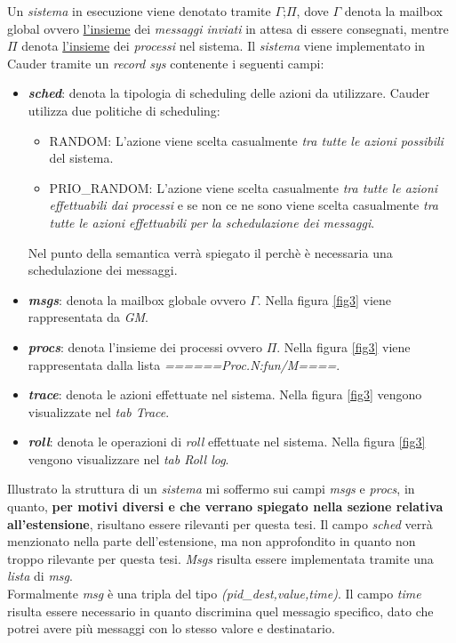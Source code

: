 \documentclass[background.tex]{subfiles}
\begin{document}
Un \textit{sistema} in esecuzione viene denotato tramite $\Gamma$;$\Pi$, dove $\Gamma$ denota la mailbox global ovvero \underline{l'insieme} dei \textit{messaggi inviati} in attesa di essere consegnati, mentre $\Pi$ denota \underline{l'insieme} dei \textit{processi} nel sistema.
Il \textit{sistema} viene implementato in Cauder tramite un \textit{record sys} contenente i seguenti campi:
	\begin{itemize}
		\item \textit{\textbf{sched}}: denota la tipologia di scheduling delle azioni da utilizzare. Cauder utilizza due politiche di scheduling:
			\begin{itemize}
				\item RANDOM: L'azione viene scelta casualmente \textit{tra tutte le azioni possibili} del sistema.
				\item PRIO\_RANDOM: L'azione viene scelta casualmente \textit{tra tutte le azioni effettuabili dai processi} e se non ce ne sono viene scelta casualmente \textit{tra tutte le azioni effettuabili per la schedulazione dei messaggi}.
			\end{itemize}
			Nel punto della semantica verrà spiegato il perchè è necessaria una schedulazione dei messaggi.
		\item \textit{\textbf{msgs}}: denota la mailbox globale ovvero $\Gamma$. Nella figura \ref{fig3} viene rappresentata da \textit{GM}.
		\item \textit{\textbf{procs}}: denota l'insieme dei processi ovvero $\Pi$. Nella figura \ref{fig3} viene rappresentata dalla lista \textit{======Proc.N:fun/M====}.
		\item \textit{\textbf{trace}}: denota le azioni effettuate nel sistema. Nella figura \ref{fig3} vengono visualizzate nel \textit{tab Trace}.
		\item \textit{\textbf{roll}}: denota le operazioni di \textit{roll} effettuate nel sistema. Nella figura \ref{fig3} vengono visualizzare nel \textit{tab Roll log}.
	\end{itemize}
Illustrato la struttura di un \textit{sistema} mi soffermo sui campi \textit{msgs} e \textit{procs}, in quanto, \textbf{per motivi diversi e che verrano spiegato nella sezione relativa all'estensione}, risultano essere rilevanti per questa tesi.
Il campo \textit{sched} verrà menzionato nella parte dell'estensione, ma non approfondito in quanto non troppo rilevante per questa tesi.
\textit{Msgs} risulta essere implementata tramite una \textit{lista} di \textit{msg}.\\
Formalmente \textit{msg} è una tripla del tipo \textit{(pid\_dest,value,time)}. Il campo \textit{time} risulta essere necessario in quanto discrimina quel messagio specifico, dato che potrei avere più messaggi con lo stesso valore e destinatario.
\end{document}
